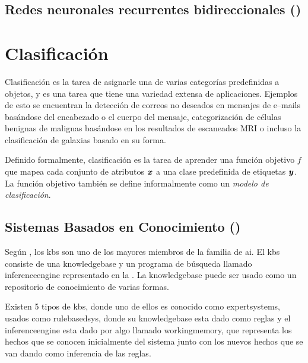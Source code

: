 \subsection{Redes neuronales recurrentes bidireccionales ()}


\section{Clasificación} \label{subsec:clasification}
Clasificación es la tarea de asignarle una de varias categorías predefinidas a objetos, y es una tarea que tiene una variedad extensa de aplicaciones. Ejemplos de esto se encuentran la detección de correos no deseados en mensajes de e--mails basándose del encabezado o el cuerpo del mensaje, categorización de células benignas de malignas basándose en los resultados de escaneados MRI o incluso la clasificación de galaxias basado en su forma.

Definido formalmente, clasificación es la tarea de aprender una función objetivo $f$ que mapea cada conjunto de atributos ${\bm{x}}$ a una clase predefinida de etiquetas ${\bm{y}}$. La función objetivo también se define informalmente como un \emph{modelo de clasificación}.


\subsection{Sistemas Basados en Conocimiento ()} \label{sec:KBS}
Según \cite{sajja2010knowledge}, los \gls{kbs} son uno de los mayores miembros de la familia de \gls{ai}. El \gls{kbs} consiste de una \gls{knowledgebase} y un programa de búsqueda llamado \gls{inferenceengine} representado en la . La \gls{knowledgebase} puede ser usado como un repositorio de conocimiento de varias formas.

Existen 5 tipos de \gls{kbs}, donde uno de ellos es conocido como \gls{expertsystems}, usados como \gls{rulebasedsys}, donde su \gls{knowledgebase} esta dado como reglas y el \gls{inferenceengine} esta dado por algo llamado \gls{workingmemory}, que representa los hechos que se conocen inicialmente del sistema junto con los nuevos hechos que se van dando como inferencia de las reglas.

